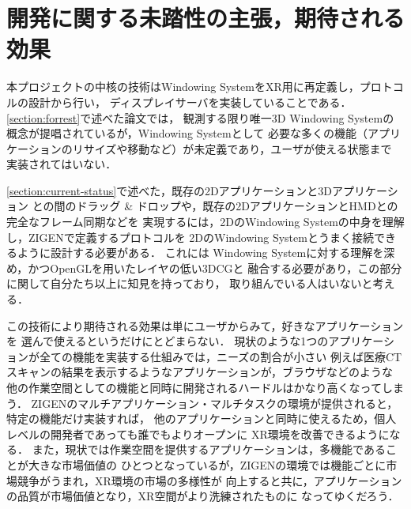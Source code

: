 \section{開発に関する未踏性の主張，期待される効果}
\label{section:dev-effect}

本プロジェクトの中核の技術はWindowing SystemをXR用に再定義し，プロトコルの設計から行い，
ディスプレイサーバを実装していることである．\ref{section:forrest}で述べた論文では，
観測する限り唯一3D Windowing Systemの概念が提唱されているが，Windowing Systemとして
必要な多くの機能（アプリケーションのリサイズや移動など）が未定義であり，ユーザが使える状態まで
実装されてはいない．

\ref{section:current-status}で述べた，既存の2Dアプリケーションと3Dアプリケーション
との間のドラッグ \& ドロップや，既存の2DアプリケーションとHMDとの完全なフレーム同期などを
実現するには，2DのWindowing Systemの中身を理解し，ZIGENで定義するプロトコルを
2DのWindowing Systemとうまく接続できるように設計する必要がある．
これには Windowing Systemに対する理解を深め，かつOpenGLを用いたレイヤの低い3DCGと
融合する必要があり，この部分に関して自分たち以上に知見を持っており，
取り組んでいる人はいないと考える．

この技術により期待される効果は単にユーザからみて，好きなアプリケーションを
選んで使えるというだけにとどまらない．
現状のような1つのアプリケーションが全ての機能を実装する仕組みでは，ニーズの割合が小さい
例えば医療CTスキャンの結果を表示するようなアプリケーションが，ブラウザなどのような
他の作業空間としての機能と同時に開発されるハードルはかなり高くなってしまう．
ZIGENのマルチアプリケーション・マルチタスクの環境が提供されると，特定の機能だけ実装すれば，
他のアプリケーションと同時に使えるため，個人レベルの開発者であっても誰でもよりオープンに
XR環境を改善できるようになる．
また，現状では作業空間を提供するアプリケーションは，多機能であることが大きな市場価値の
ひとつとなっているが，ZIGENの環境では機能ごとに市場競争がうまれ，XR環境の市場の多様性が
向上すると共に，アプリケーションの品質が市場価値となり，XR空間がより洗練されたものに
なってゆくだろう．

